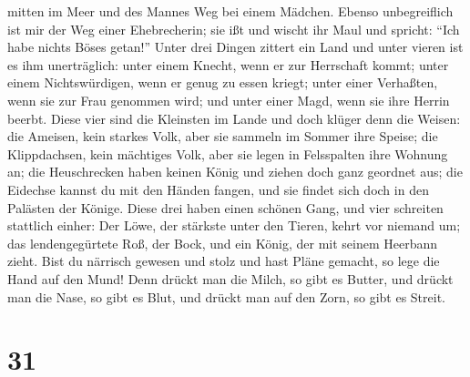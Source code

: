 mitten im Meer und des Mannes Weg bei einem Mädchen. 
Ebenso unbegreiflich ist mir der Weg einer Ehebrecherin; sie ißt und
wischt ihr Maul und spricht: ``Ich habe nichts Böses getan!''
 Unter drei Dingen zittert ein Land und unter vieren ist
es ihm unerträglich:  unter einem Knecht, wenn er zur
Herrschaft kommt; unter einem Nichtswürdigen, wenn er genug zu essen
kriegt;  unter einer Verhaßten, wenn sie zur Frau
genommen wird; und unter einer Magd, wenn sie ihre Herrin beerbt.
 Diese vier sind die Kleinsten im Lande und doch klüger
denn die Weisen:  die Ameisen, kein starkes Volk, aber
sie sammeln im Sommer ihre Speise;  die Klippdachsen,
kein mächtiges Volk, aber sie legen in Felsspalten ihre Wohnung an;
 die Heuschrecken haben keinen König und ziehen doch ganz
geordnet aus;  die Eidechse kannst du mit den Händen
fangen, und sie findet sich doch in den Palästen der Könige.
 Diese drei haben einen schönen Gang, und vier schreiten
stattlich einher:  Der Löwe, der stärkste unter den
Tieren, kehrt vor niemand um;  das lendengegürtete Roß,
der Bock, und ein König, der mit seinem Heerbann zieht. 
Bist du närrisch gewesen und stolz und hast Pläne gemacht, so lege die
Hand auf den Mund!  Denn drückt man die Milch, so gibt es
Butter, und drückt man die Nase, so gibt es Blut, und drückt man auf den
Zorn, so gibt es Streit.

\hypertarget{section-30}{%
\section{31}\label{section-30}}

